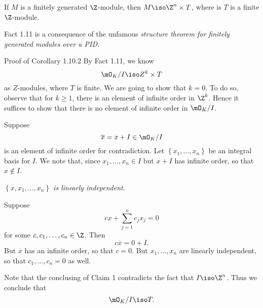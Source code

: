 \documentclass[pmath441]{subfiles}
\begin{document}
    \begin{fact}{}
        If $M$ is a finitely generated $\Z$-module, then $M\iso\Z^n\times T$, where is $T$ is a finite $\Z$-module.
    \end{fact}

    \np Fact 1.11 is a consequence of the unfamous \textit{structure theorem for finitely generated modules over a PID}.

    \begin{boxyproof}{Proof of Corollary 1.10.2}
        By Fact 1.11, we know
        \begin{equation*}
            \mO_K /I\iso Z^k\times T
        \end{equation*}
        as $Z$-modules, where $T$ is finite. We are going to show that $k=0$. To do so, observe that for $k\geq 1$, there is an element of infinite order in $\Z^k$. Hence it suffices to show that there is no element of infinite order in $\mO_K /I$.

        Suppose
        \begin{equation*}
            \overline{x} = x+I \in \mO_K /I
        \end{equation*}
        is an element of infinite order for contradiction. Let $\left\lbrace x_1,\ldots,x_n \right\rbrace$ be an integral basis for $I$. We note that, since $x_1,\ldots,x_n\in I$ but $x+I$ has infinite order, so that $x\notin I$. 

        \begin{claim}
            \textit{$\left\lbrace x,x_1,\ldots,x_n \right\rbrace$ is linearly independent.}

            Suppose
            \begin{equation*}
                cx + \sum^{n}_{j=1} c_jx_j = 0
            \end{equation*}
            for some $c,c_1,\ldots,c_n\in\Z$. Then
            \begin{equation*}
                c\overline{x} = 0 + I.
            \end{equation*}
            But $\overline{x}$ has an infinite order, so that $c=0$. But $x_1,\ldots,x_n$ are linearly independent, so that $c_1,\ldots,c_n=0$ as well.
        \end{claim}

        Note that the conclusing of Claim 1 contradicts the fact that $I\iso\Z^n$. Thus we conclude that
        \begin{equation*}
            \mO_K /I\iso T.
        \end{equation*}
    \end{boxyproof}
    
\end{document}

